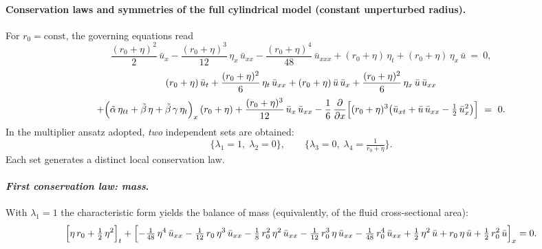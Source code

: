 \documentclass[alpha-refs, 12pt]{wiley-article}
\newcommand{\pd}[2]{\frac{\partial #1}{\partial #2}}
\begin{document}
\paragraph{Conservation laws and symmetries of the full cylindrical model (constant unperturbed radius).} For $r_{0}=\mathrm{const}$, the governing equations read
\begin{equation}\label{eq:d1}
  \frac{(r_{0}+\eta)^{2}}{2}\,\bar{u}_{x}
  -\frac{(r_{0}+\eta)^{3}}{12}\,\eta_{x}\,\bar{u}_{xx}
  -\frac{(r_{0}+\eta)^{4}}{48}\,\bar{u}_{xxx}
  +(r_{0}+\eta)\,\eta_{t}
  +(r_{0}+\eta)\,\eta_{x}\,\bar{u}\ =\ 0,
\end{equation}
\begin{multline}\label{eq:d2}
  (r_{0}+\eta)\,\bar{u}_{t}
  +\frac{(r_{0}+\eta)^{2}}{6}\,\eta_{t}\,\bar{u}_{xx}
  +(r_{0}+\eta)\,\bar{u}\,\bar{u}_{x}
  +\frac{(r_{0}+\eta)^{2}}{6}\,\eta_{x}\,\bar{u}\,\bar{u}_{xx}
  \\[2pt]
  +\Bigl(\tilde{\alpha}\,\eta_{tt}
        +\tilde{\beta}\,\eta
        +\tilde{\beta}\,\gamma\,\eta_{t}\Bigr)_{x}\,(r_{0}+\eta)
  +\frac{(r_{0}+\eta)^{3}}{12}\,\bar{u}_{x}\,\bar{u}_{xx}
  -\frac{1}{6}\,\pd{}{x}
        \Bigl[(r_{0}+\eta)^{3}
              \bigl(\bar{u}_{xt}
                    +\bar{u}\,\bar{u}_{xx}
                    -\tfrac{1}{2}\,\bar{u}_{x}^{2}\bigr)\Bigr]\ =\ 0.
\end{multline}
In the multiplier ansatz adopted, \emph{two} independent sets are obtained:
\[
  \bigl\{\lambda_{1}=1,\;\lambda_{2}=0\bigr\},
  \qquad
  \bigl\{\lambda_{3}=0,\;
         \lambda_{4}=\tfrac{1}{r_{0}+\eta}\bigr\}.
\]
Each set generates a distinct local conservation law.

\paragraph{\textit{First conservation law: mass}.} With $\lambda_{1}=1$ the characteristic form yields the balance of mass (equivalently, of the fluid cross-sectional area):
\begin{equation}\label{eq:a}
  \Bigl[\eta\,r_{0}+\tfrac12\,\eta^{2}\Bigr]_{t}
  +\Bigl[
        -\tfrac1{48}\,\eta^{4}\,\bar{u}_{xx}
        -\tfrac1{12}\,r_{0}\,\eta^{3}\,\bar{u}_{xx}
        -\tfrac18\,r_{0}^{2}\,\eta^{2}\,\bar{u}_{xx}
        -\tfrac1{12}\,r_{0}^{3}\,\eta\,\bar{u}_{xx}
        -\tfrac1{48}\,r_{0}^{4}\,\bar{u}_{xx}
        +\tfrac12\,\eta^{2}\,\bar{u}
        +r_{0}\,\eta\,\bar{u}
        +\tfrac12\,r_{0}^{2}\,\bar{u}
  \Bigr]_{x}=0.
\end{equation}
\end{document}
